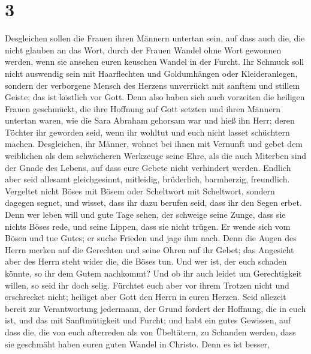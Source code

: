 \hypertarget{section-2}{%
\section{3}\label{section-2}}

 Desgleichen sollen die Frauen ihren Männern untertan
sein, auf dass auch die, die nicht glauben an das Wort, durch der Frauen
Wandel ohne Wort gewonnen werden,  wenn sie ansehen euren
keuschen Wandel in der Furcht.  Ihr Schmuck soll nicht
auswendig sein mit Haarflechten und Goldumhängen oder Kleideranlegen,
 sondern der verborgene Mensch des Herzens unverrückt mit
sanftem und stillem Geiste; das ist köstlich vor Gott. 
Denn also haben sich auch vorzeiten die heiligen Frauen geschmückt, die
ihre Hoffnung auf Gott setzten und ihren Männern untertan waren,
 wie die Sara Abraham gehorsam war und hieß ihn Herr;
deren Töchter ihr geworden seid, wenn ihr wohltut und euch nicht lasset
schüchtern machen.  Desgleichen, ihr Männer, wohnet bei
ihnen mit Vernunft und gebet dem weiblichen als dem schwächeren
Werkzeuge seine Ehre, als die auch Miterben sind der Gnade des Lebens,
auf dass eure Gebete nicht verhindert werden.  Endlich
aber seid allesamt gleichgesinnt, mitleidig, brüderlich, barmherzig,
freundlich.  Vergeltet nicht Böses mit Bösem oder
Scheltwort mit Scheltwort, sondern dagegen segnet, und wisset, dass ihr
dazu berufen seid, dass ihr den Segen erbet.  Denn wer
leben will und gute Tage sehen, der schweige seine Zunge, dass sie
nichts Böses rede, und seine Lippen, dass sie nicht trügen.
 Er wende sich vom Bösen und tue Gutes; er suche Frieden
und jage ihm nach.  Denn die Augen des Herrn merken auf
die Gerechten und seine Ohren auf ihr Gebet; das Angesicht aber des
Herrn steht wider die, die Böses tun.  Und wer ist, der
euch schaden könnte, so ihr dem Gutem nachkommt?  Und ob
ihr auch leidet um Gerechtigkeit willen, so seid ihr doch selig.
Fürchtet euch aber vor ihrem Trotzen nicht und erschrecket nicht;
 heiliget aber Gott den Herrn in euren Herzen. Seid
allezeit bereit zur Verantwortung jedermann, der Grund fordert der
Hoffnung, die in euch ist,  und das mit Sanftmütigkeit
und Furcht; und habt ein gutes Gewissen, auf dass die, die von euch
afterreden als von Übeltätern, zu Schanden werden, dass sie geschmäht
haben euren guten Wandel in Christo.  Denn es ist besser,
